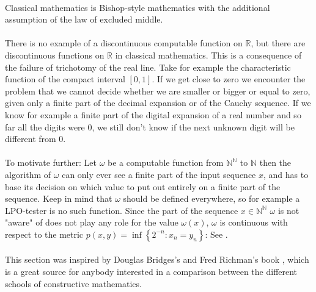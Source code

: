 \documentclass[11pt,a4paper,leqno]{report}
\numberwithin{equation}{chapter}
\begin{document}
\\
Classical mathematics is Bishop-style mathematics with the additional assumption of the law of excluded middle.\\
\\
There is no example of a discontinuous computable function on $\mathbb{R}$, but there are discontinuous functions on $\mathbb{R}$ in classical mathematics. This is a consequence of the failure of trichotomy of the real line. Take for example the characteristic function of the compact interval $[0,1]$. If we get close to zero we encounter the problem that we cannot decide whether we are smaller or bigger or equal to zero, given only a finite part of the decimal expansion or of the Cauchy sequence. If we know for example a finite part of the digital expansion of a real number and so far all the digits were 0, we still don't know if the next unknown digit will be different from 0.\\
\\
To motivate further: Let $\omega$ be a computable function from $\mathbb{N}^{\mathbb{N}}$ to $\mathbb{N}$ then the algorithm of $\omega$ can only ever see a finite part of the input sequence $x$, and has to base its decision on which value to put out entirely on a finite part of the sequence. Keep in mind that $\omega$ should be defined everywhere, so for example a LPO-tester is no such function. Since the part of the sequence $x\in\mathbb{N}^{\mathbb{N}}$ $\omega$ is not "aware" of does not play any role for the value $\omega(x)$, $\omega$ is continuous with respect to the metric $p(x,y)=\inf\left\{2^{-n}:x_n=y_n\right\}$: See \cite{VAR}.
\\
\\
This section was inspired by Douglas Bridges's and Fred Richman's book \cite{VAR}, which is a great source for anybody interested in a comparison between the different schools of constructive mathematics.
\end{document}
